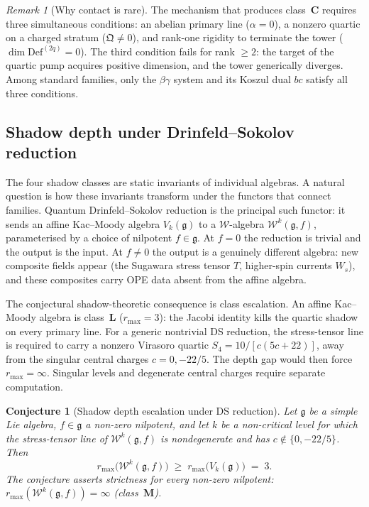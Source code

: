 \documentclass[11pt]{article}
\theoremstyle{plain}
\newtheorem{conjecture}[theorem]{Conjecture}
\theoremstyle{definition}
\theoremstyle{remark}
\newtheorem{remark}[theorem]{Remark}
\providecommand{\fg}{\mathfrak{g}}
\providecommand{\cW}{\mathcal{W}}
\begin{document}
\begin{remark}[Why contact is rare]
\label{rem:contact-rarity}
The mechanism that produces class~$\mathbf{C}$ requires three
simultaneous conditions: an abelian primary line ($\alpha = 0$),
a nonzero quartic on a charged stratum
($\mathfrak{Q} \neq 0$), and rank-one rigidity to terminate
the tower ($\dim\mathrm{Def}^{(2q)} = 0$). The third condition
fails for rank $\geq 2$: the target of the quartic pump acquires
positive dimension, and the tower generically diverges. Among
standard families, only the $\beta\gamma$ system and its Koszul
dual $bc$ satisfy all three conditions.
\end{remark}


\subsection{Shadow depth under Drinfeld--Sokolov reduction}
\label{ssec:ds-shadow-depth}

The four shadow classes are static invariants of individual
algebras. A natural question is how these invariants
transform under the functors that connect families. Quantum
Drinfeld--Sokolov reduction is the principal such functor: it
sends an affine Kac--Moody algebra $V_k(\fg)$ to a
$\cW$-algebra $\cW^k(\fg, f)$, parameterised by a choice of
nilpotent $f \in \fg$. At $f = 0$ the reduction is trivial
and the output is the input. At $f \neq 0$ the output is a
genuinely different algebra: new composite fields appear (the
Sugawara stress tensor $T$, higher-spin currents $W_s$), and
these composites carry OPE data absent from the affine algebra.

The conjectural shadow-theoretic consequence is class escalation. An
affine Kac--Moody algebra is class~$\mathbf{L}$ ($r_{\max}=3$):
the Jacobi identity kills the quartic shadow on every primary line.
For a generic nontrivial DS reduction, the stress-tensor line is
required to carry a nonzero Virasoro quartic
$S_4 = 10/[c(5c{+}22)]$, away from the singular central charges
$c=0,-22/5$. The depth gap would then force
$r_{\max}=\infty$. Singular levels and degenerate central charges
require separate computation.

\begin{conjecture}[Shadow depth escalation under DS reduction]
\label{conj:ds-shadow-escalation-standalone}
Let $\fg$ be a simple Lie algebra, $f \in \fg$ a non-zero
nilpotent, and let $k$ be a non-critical level for which the
stress-tensor line of $\cW^k(\fg,f)$ is nondegenerate and has
$c\notin\{0,-22/5\}$. Then
\[
 r_{\max}\bigl(\cW^k(\fg, f)\bigr)
 \;\geq\;
 r_{\max}\bigl(V_k(\fg)\bigr)
 \;=\; 3.
\]
The conjecture asserts strictness for every non-zero nilpotent:
$r_{\max}(\cW^k(\fg, f)) = \infty$
\textup{(}class~$\mathbf{M}$\textup{)}.
\end{conjecture}
\end{document}
